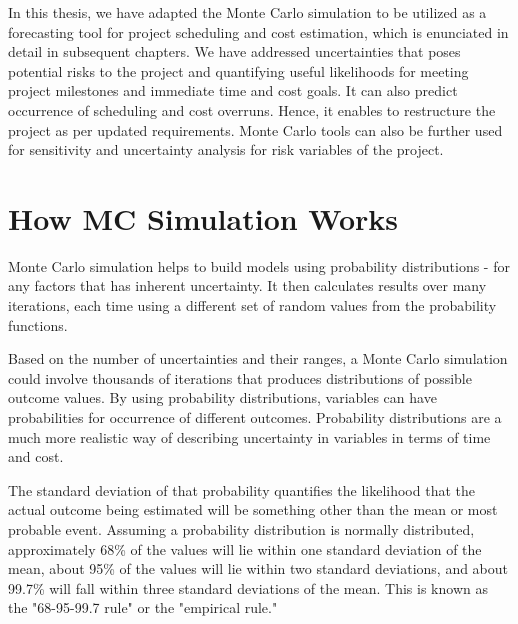In this thesis, we have adapted the Monte Carlo simulation to be utilized as a forecasting tool for project scheduling and cost estimation, which is enunciated in detail in subsequent chapters. We have addressed uncertainties that poses potential risks to the project and quantifying useful likelihoods for meeting project milestones and immediate time and cost goals. It can also predict occurrence of scheduling and cost overruns. Hence, it enables to restructure the project as per updated requirements. Monte Carlo tools can also be further used for sensitivity and uncertainty analysis for risk variables of the project. 

\section{How MC Simulation Works}

Monte Carlo simulation helps to build models using probability distributions - for any factors that has inherent uncertainty. It then calculates results over many iterations, each time using a different set of random values from the probability functions. 

Based on the number of uncertainties and their ranges, a Monte Carlo simulation could involve thousands of iterations that produces distributions of possible outcome values. By using probability distributions, variables can have probabilities for occurrence of different outcomes. Probability distributions are a much more realistic way of describing uncertainty in variables in terms of time and cost.

The standard deviation of that probability quantifies the likelihood that the actual outcome being estimated will be something other than the mean or most probable event. Assuming a probability distribution is normally distributed, approximately 68\% of the values will lie within one standard deviation of the mean, about 95\% of the values will lie within two standard deviations, and about 99.7\% will fall within three standard deviations of the mean. This is known as the "68-95-99.7 rule" \cite{MCSimulation} or the "empirical rule."

